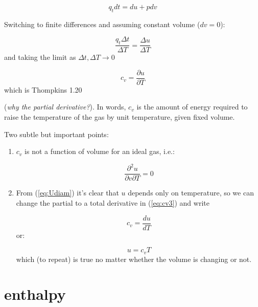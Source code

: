 \documentclass[12pt]{article}
\begin{document}
  \begin{equation}
    \label{eq:cv1}
    q_t dt= du + p dv
  \end{equation}

Switching to finite differences and assuming constant volume ($dv = 0$):

  \begin{equation}
    \label{eq:cv2}
    \frac{q_t \Delta t}{\Delta T} = \frac{\Delta u}{\Delta T}
  \end{equation}
and taking the limit as $\Delta t,\Delta T \rightarrow 0$

  \begin{equation}
    \label{eq:cv3}
    c_v = \frac{\partial{u}}{\partial T}
  \end{equation}
which is Thompkins 1.20


(\textit{why the partial derivative?}).  In words, $c_v$ is the amount of energy
required to raise the temperature of the gas by unit temperature, given
fixed volume.


Two subtle but important points:

\begin{enumerate}
\item $c_v$ is not a function of volume for an ideal gas,
i.e.:

\begin{equation}
  \label{eq:cv4}
  \frac{\partial^2 u}{\partial v \partial T} = 0
\end{equation}

\item From (\ref{eq:Udiam}) it's clear that $u$ depends only on temperature, so we can
change the partial to a total derivative in (\ref{eq:cv3}) and write

  \begin{equation}
    \label{eq:cv5}
    c_v = \frac{du}{dT}
  \end{equation}
or:

  \begin{equation}
    \label{eq:cv6}
    u = c_v T
  \end{equation}
which (to repeat) is true no matter whether the volume is changing or not.

\end{enumerate}




\section{enthalpy}
\end{document}
